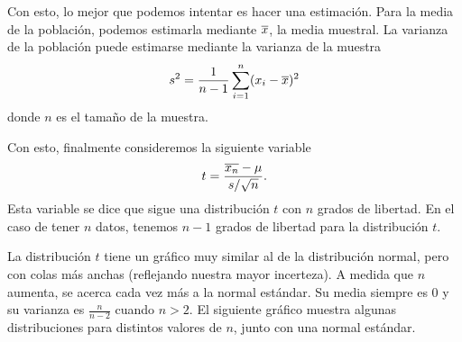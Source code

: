 Con esto, lo mejor que podemos intentar es hacer una estimación. Para la media de la población, podemos estimarla mediante \(\overline{x}\), la media muestral. La varianza de la población puede estimarse mediante la varianza de la muestra \[s^2 = \frac{1}{n-1}\sum_{i=1}^n (x_i-\overline{x})^2\] donde \(n\) es el tamaño de la muestra.

Con esto, finalmente consideremos la siguiente variable \[t=\frac{\overline{x_n} - \mu}{s/\sqrt{n}}.\] Esta variable se dice que sigue una distribución \(t\) con \(n\) grados de libertad. En el caso de tener \(n\) datos, tenemos \(n-1\) grados de libertad para la distribución \(t\).

La distribución \(t\) tiene un gráfico muy similar al de la distribución normal, pero con colas más anchas (reflejando nuestra mayor incerteza). A medida que \(n\) aumenta, se acerca cada vez más a la normal estándar. Su media siempre es \(0\) y su varianza es \(\frac{n}{n-2}\) cuando \(n>2\). El siguiente gráfico muestra algunas distribuciones para distintos valores de \(n\), junto con una normal estándar.

